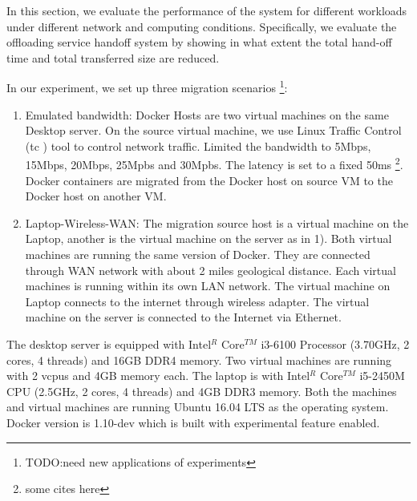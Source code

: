 
In this section, we evaluate the performance of the system for different workloads under different network and computing conditions. Specifically, we evaluate the offloading service handoff system by showing in what extent the total hand-off time and total transferred size are reduced.

In our experiment, we set up three migration scenarios
\footnote{TODO:need new applications of experiments}: 
\begin{enumerate}
    \item Emulated bandwidth:
    Docker Hosts are two virtual machines on the same Desktop server. On the source virtual machine, we use Linux Traffic Control (tc\cite{tc} )  tool to control network traffic. Limited the bandwidth to 5Mbps, 15Mbps, 20Mbps, 25Mpbs and 30Mpbs. The latency is set to a fixed 50ms \footnote{some cites here}.
    Docker containers are migrated from the Docker host on source VM to the Docker host on another VM.
    
    \item Laptop-Wireless-WAN:
    The migration source host is a virtual machine on the Laptop, another is the virtual machine on the server as in 1). Both virtual machines are running the same version of Docker.  They are connected through WAN network with about 2 miles geological distance. Each virtual machines is running within its own LAN network. The virtual machine on Laptop connects to the internet through wireless adapter. The virtual machine on the server is connected to the Internet via Ethernet. 
\end{enumerate}

The desktop server is equipped with Intel$^{R}$ Core$^{TM}$ i3-6100 Processor (3.70GHz, 2 cores, 4 threads) and 16GB DDR4 memory. Two virtual machines are running with 2 vcpus and 4GB memory each.
The laptop is with Intel$^{R}$ Core$^{TM}$ i5-2450M CPU (2.5GHz, 2 cores, 4 threads) and 4GB DDR3 memory. Both the machines and virtual machines are running Ubuntu 16.04 LTS as the operating system. Docker version is 1.10-dev which is built with experimental feature enabled.









